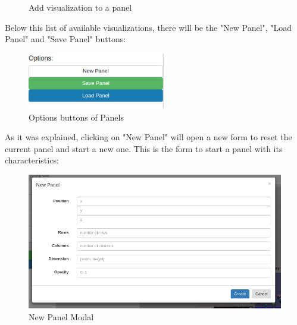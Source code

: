 \documentclass[a4paper, 12pt]{book}
\begin{document}
\begin{figure}[H]
 \centering
 \caption{Add visualization to a panel}
 \label{f:threedcexamples}
\end{figure}

Below this list of available visualizations, there will be the "New Panel", "Load Panel" and "Save Panel" buttons:

\begin{figure}[H]
  \centering
  \includegraphics[width=6cm, keepaspectratio]{img/development/panelsbuttons}
  \caption{Options buttons of Panels}
  \label{fig:panelsbuttons}
\end{figure}

As it was explained, clicking on "New Panel" will open a new form to reset the current panel and start a new one. This is the form to start a panel with its characteristics:

\begin{figure}[H]
  \centering
  \includegraphics[width=16cm, keepaspectratio]{img/development/newpanelmodal}
  \caption{New Panel Modal}
  \label{fig:newpanelmodal}
\end{figure}
\end{document}
